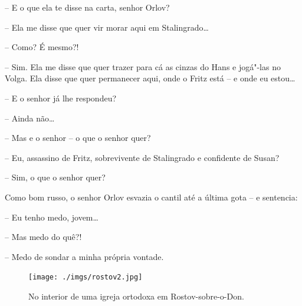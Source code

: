 -- E o que ela te disse na carta, senhor Orlov?

-- Ela me disse que quer vir morar aqui em Stalingrado\ldots{}

-- Como? É mesmo?!

-- Sim. Ela me disse que quer trazer para cá as cinzas do Hans e
jogá"-las no Volga. Ela disse que quer permanecer aqui, onde o Fritz está
-- e onde eu estou\ldots{}

-- E o senhor já lhe respondeu?

-- Ainda não\ldots{}

-- Mas e o senhor -- o que o senhor quer?

-- Eu, assassino de Fritz, sobrevivente de Stalingrado e confidente de
Susan?

-- Sim, o que o senhor quer?

Como bom russo, o senhor Orlov esvazia o cantil até a última gota -- e
sentencia:

-- Eu tenho medo, jovem\ldots{}

-- Mas medo do quê?!

-- Medo de sondar a minha própria vontade.


\movetoevenpage
\begin{absolutelynopagebreak}
\begin{vplace}
\begin{figure}[H]
\begin{adjustwidth}{-1.8cm}{}
  \vspace{2.7cm}
  \texttt{[image: ./imgs/rostov2.jpg]}  
\end{adjustwidth}
  \caption{No interior de uma igreja ortodoxa em Rostov-sobre-o-Don.}

\thispagestyle{empty}

\end{figure}
\end{vplace}

\end{absolutelynopagebreak}


